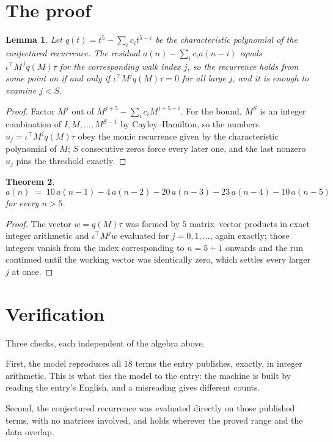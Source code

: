 \documentclass[11pt,a4paper]{article}
\theoremstyle{plain}
\newtheorem{theorem}{Theorem}
\newtheorem{lemma}[theorem]{Lemma}
\theoremstyle{definition}
\begin{document}
\section{The proof}

\begin{lemma}\label{lem:crit}
Let $q(t)=t^{5}-\sum_i c_it^{5-i}$ be the characteristic polynomial of the
conjectured recurrence. The residual $a(n)-\sum_ic_ia(n-i)$ equals
$\iota^{\!\top}M^{\,j}q(M)\tau$ for the corresponding walk index $j$, so the recurrence
holds from some point on if and only if $\iota^{\!\top}M^{j}q(M)\tau=0$ for all large $j$,
and it is enough to examine $j<S$.
\end{lemma}

\begin{proof}
Factor $M^{j}$ out of $M^{j+5}-\sum_ic_iM^{j+5-i}$. For the bound, $M^{S}$
is an integer combination of $I,M,\dots,M^{S-1}$ by Cayley--Hamilton, so the numbers
$u_j=\iota^{\!\top}M^{j}q(M)\tau$ obey the monic recurrence given by the characteristic
polynomial of $M$; $S$ consecutive zeros force every later one, and the last nonzero $u_j$
pins the threshold exactly.
\end{proof}

\begin{theorem}
\[
a(n)\;=\;10\,a(n-1) - 4\,a(n-2) - 20\,a(n-3) - 23\,a(n-4) - 10\,a(n-5)
\]
for every $n>5$.
\end{theorem}

\begin{proof}
The vector $w=q(M)\tau$ was formed by $5$ matrix--vector products in exact integer
arithmetic and $\iota^{\!\top}M^{j}w$ evaluated for $j=0,1,\dots$, again exactly; those
integers vanish from the index corresponding to $n=5+1$ onwards and the run continued
until the working vector was identically zero, which settles every larger $j$ at once.
\end{proof}

\section{Verification}

Three checks, each independent of the algebra above.

First, the model reproduces all $18$ terms the entry publishes, exactly, in integer
arithmetic. This is what ties the model to the entry: the machine is built by reading the
entry's English, and a misreading gives different counts.

Second, the conjectured recurrence was evaluated directly on those published terms, with no
matrices involved, and holds wherever the proved range and the data overlap.
\end{document}
